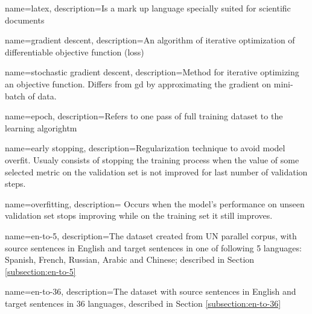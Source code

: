 

\makeglossaries

{
    name=latex,
    description={Is a mark up language specially suited 
    for scientific documents}
}

{
    name=gradient descent,
    description={An algorithm of iterative optimization of 
		 differentiable objective function (loss)}
}

{
    name=stochastic gradient descent,
    description={Method for iterative optimizing an objective function.
		 Differs from \gls{gd} by approximating the gradient
		 on mini-batch of data.}
}

{
    name=epoch,
    description={Refers to one pass of full training dataset to the learning 
		 algorightm
		}
}

{
    name=early stopping,
    description={Regularization technique to avoid model overfit.
		 Usualy consists of stopping the training process
		 when the value of some selected metric on the 
		 validation set is not improved for last number of
		 validation steps.
		}
}

{
    name=overfitting,
    description={
		 Occurs when the model's performance on unseen validation
		 set stops improving while on the training set
		 it still improves.
		}
}

{
    name=en-to-5,
    description={The dataset created from UN parallel corpus,
	with source sentences in English and target sentences
	in one of following 5 languages: Spanish, French, Russian,
	Arabic and Chinese; described in Section \ref{subsection:en-to-5}
	}
}

{
    name=en-to-36,
    description={The dataset with source sentences in English
	and target sentences in 36 languages, described
	in Section \ref{subsection:en-to-36}
	}
}

